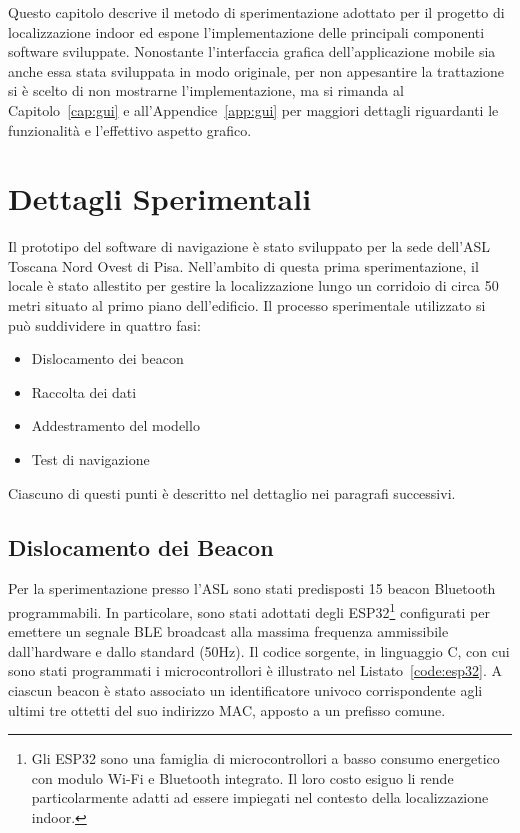 \newcommand{\inputsource}[2]{%
	\inputminted[frame=single, framesep=1pt,
  breaklines=true,fontsize=\footnotesize]{#1}{#2}%
}


Questo capitolo descrive il metodo di sperimentazione adottato per il progetto
di localizzazione indoor ed espone l'implementazione delle principali
componenti software sviluppate. Nonostante l'interfaccia grafica
dell'applicazione mobile sia anche essa stata sviluppata in modo originale, per
non appesantire la trattazione si è scelto di non mostrarne l'implementazione,
ma si rimanda al Capitolo~\ref{cap:gui} e all'Appendice~\ref{app:gui} per
maggiori dettagli riguardanti le funzionalità e l'effettivo aspetto grafico.

\section{Dettagli Sperimentali}
Il prototipo del software di navigazione è stato sviluppato per la sede
dell'ASL Toscana Nord Ovest di Pisa. Nell'ambito di questa prima
sperimentazione, il locale è stato allestito per gestire la localizzazione
lungo un corridoio di circa 50 metri situato al primo piano dell'edificio. Il
processo sperimentale utilizzato si può suddividere in quattro fasi:
\begin{itemize}
	\item Dislocamento dei beacon
	\item Raccolta dei dati
	\item Addestramento del modello
	\item Test di navigazione
\end{itemize}
Ciascuno di questi punti è descritto nel dettaglio nei paragrafi successivi.
\subsection{Dislocamento dei Beacon}
Per la sperimentazione presso l'ASL sono stati predisposti 15 beacon Bluetooth
programmabili. In particolare, sono stati adottati degli ESP32\footnote{Gli
  ESP32 sono una famiglia di microcontrollori a basso consumo energetico con
  modulo Wi-Fi e Bluetooth integrato. Il loro costo esiguo li rende
  particolarmente adatti ad essere impiegati nel contesto della localizzazione
  indoor.} configurati per emettere un segnale
BLE broadcast alla massima frequenza ammissibile dall'hardware e dallo standard
(50Hz). Il codice sorgente, in linguaggio C, con cui sono stati programmati i
microcontrollori è illustrato nel Listato~\ref{code:esp32}. A ciascun beacon è
stato associato un identificatore univoco corrispondente agli ultimi tre
ottetti del suo indirizzo MAC, apposto a un prefisso comune.

